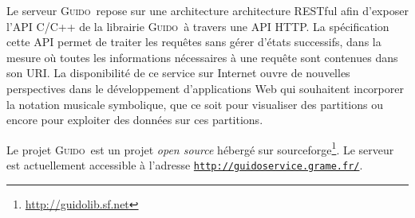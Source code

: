 \documentclass{article}
\newcommand{\footurl}[1]	{\footnote{\url{#1}}}
\newcommand{\icode}[1]		{{\small \texttt{#1}}}
\newcommand{\guido}		{\textsc{Guido}}
\begin{document}
Le serveur \guido\ repose sur une architecture architecture RESTful afin d'exposer l'API C/C++ de la librairie \guido\ à travers une  API HTTP. La spécification cette API permet de traiter les requêtes sans gérer d'états successifs, dans la mesure où toutes les informations nécessaires à une requête sont contenues dans son URI. 
La disponibilité de ce service sur Internet ouvre de nouvelles perspectives dans le développement d'applications Web qui souhaitent incorporer la notation musicale symbolique, que ce soit pour visualiser des partitions ou encore pour exploiter des données sur ces partitions. 

Le projet \guido\ est un projet \emph{open source} hébergé sur sourceforge\footurl{http://guidolib.sf.net}. Le serveur est actuellement accessible à l'adresse \icode{\url{http://guidoservice.grame.fr/}}.

\balance


\end{document}
